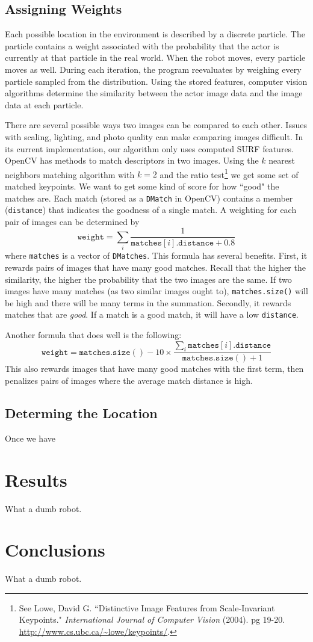 \documentclass[a4paper,11pt]{article}
\begin{document}
\subsection{Assigning Weights}
Each possible location in the environment is described by a discrete particle. The particle contains a weight associated with the probability that the actor is currently at that particle in the real world. When the robot moves, every particle moves as well. During each iteration, the program reevaluates by weighing every particle sampled from the distribution. Using the stored features, computer vision algorithms determine the similarity between the actor image data and the image data at each particle.

There are several possible ways two images can be compared to each other. Issues with scaling, lighting, and photo quality can make comparing images difficult. In its current implementation, our algorithm only uses computed SURF features. OpenCV has methods to match descriptors in two images. Using the $k$ nearest neighbors matching algorithm with $k = 2$ and the ratio test\footnote{See Lowe, David G. ``Distinctive Image Features from Scale-Invariant Keypoints." {\it International Journal of Computer Vision} (2004). pg 19-20.  \url{http://www.cs.ubc.ca/~lowe/keypoints/}.} we get some set of matched keypoints. We want to get some kind of score for how ``good" the matches are. Each match (stored as a \verb.DMatch. in OpenCV) contains a member (\verb.distance.) that indicates the goodness of a single match. A weighting for each pair of images can be determined by
\[
	\mathtt{weight} = \sum_{i} \frac1{\mathtt{matches}[i].\mathtt{distance} + 0.8}
\]
where \verb.matches. is a vector of \verb.DMatches.. This formula has several benefits. First, it rewards pairs of images that have many good matches. Recall that the higher the similarity, the higher the probability that the two images are the same. If two images have many matches (as two similar images ought to), \verb`matches.size()` will be high and there will be many terms in the summation. Secondly, it rewards matches that are {\it good}. If a match is a good match, it will have a low \verb.distance.. 

Another formula that does well is the following:
\[
\mathtt{weight} = \mathtt{matches.size()} - 10 \times \frac{\sum_{i} \mathtt{matches}[i].\mathtt{distance}}{\mathtt{matches.size()} + 1}
\]
This also rewards images that have many good matches with the first term, then penalizes pairs of images where the average match distance is high.

\subsection{Determing the Location}
Once we have


\section{Results}
What a dumb robot.

\section{Conclusions}
What a dumb robot.








  
\end{document}
